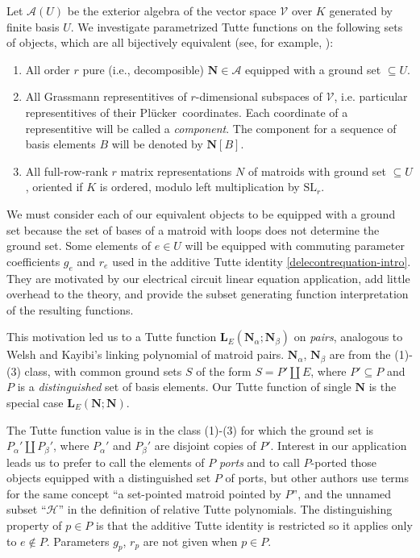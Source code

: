 \documentclass[Unicode]{cedram-alco}
\newcommand{\ext}[1]{\ensuremath{\mathbf{#1}}}
\newcommand{\Plucker}{Pl\"{u}cker\ }
\newcommand{\dunion}{\coprod}
\begin{document}
Let $\mathcal{A}(U)$ be the exterior algebra of the vector space
$\mathcal{V}$ over $K$ generated by finite basis $U$.  We investigate
parametrized Tutte functions on the following
sets
of objects, which are all bijectively equivalent (see, for example, \cite{MarcusFDMuAlPt2}):
\begin{enumerate}
\item All order $r$ pure (i.e., decomposible\cite{MarcusFDMuAlPt2})
  $\ext{N}\in\mathcal{A}$ equipped with a
  ground
  set $\subseteq U$.
\item All Grassmann representitives of
  $r$-dimensional subspaces
  of $\mathcal{V}$,
  i.e. particular representitives of their \Plucker coordinates.
  Each coordinate of a representitive will be called a \emph{component}.
  The component
  for a sequence of basis elements $B$ will be denoted by $\ext{N}[B]$.
\item All full-row-rank $r$
  matrix representations $N$ of matroids with ground set $\subseteq U$,
  oriented if $K$ is ordered, modulo left multiplication by
  $\text{SL}_r$.   
\end{enumerate}
We must consider each of our equivalent
objects to be equipped with a ground set because
the set of bases of a matroid with loops does not
determine the ground set. 
Some elements of $e\in U$ will be equipped with commuting
parameter coefficients $g_e$ and $r_e$ used in the additive Tutte
identity \ref{delecontrequation-intro}.  They are motivated by our electrical
circuit linear equation application, add little overhead to the theory,
and provide the subset generating function interpretation of
the resulting functions.

This motivation led us to a Tutte function
$\ext{L}_E(\ext{N}_\alpha; \ext{N}_\beta)$ on
\emph{pairs}, analogous to Welsh and Kayibi's
linking polynomial\cite{WelshKayibiLinking}  of matroid pairs.
$\ext{N}_\alpha$, $\ext{N}_\beta$ are from the (1)-(3) class,
with common ground sets $S$ of the form $S=P'\dunion E$,
where $P'\subseteq P$ and $P$ is a \emph{distinguished} set of
basis elements.  Our Tutte function of single $\ext{N}$ is
the special case $\ext{L}_E(\ext{N};\ext{N})$.

The Tutte function value is in the class
(1)-(3) for which the ground set is $P_\alpha'\dunion P_\beta'$,
where $P_\alpha'$ and $P_\beta'$ are disjoint copies of $P'$.
Interest in our application\cite{sdcPorted} leads us to prefer to call the
elements of $P$ \emph{ports} and to call $P$-ported those objects equipped with
a distinguished
set $P$ of ports,
but other authors use terms for the same concept
``a set-pointed matroid pointed by $P$\cite{MR0419272,SetPointedLV}'', and
the unnamed subset ``$\mathcal{H}$''
in the definition of relative Tutte polynomials\cite{RelTuttePolyDiaoHetyei}.
The distinguishing property of $p\in P$ 
is that the additive Tutte identity is restricted so it
applies only to $e\not\in P$.  Parameters $g_p$, $r_p$ are not given when
$p\in P$.
\end{document}

